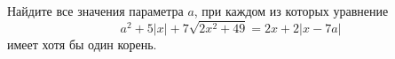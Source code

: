 \begin{ex}
	\begin{condition}
		Найдите все значения параметра \( a \), при каждом из которых уравнение \[ a^2+5|x|+7\sqrt{2x^2+49}=2x+2|x-7a| \] имеет хотя бы один корень.
	\end{condition}
\end{ex}